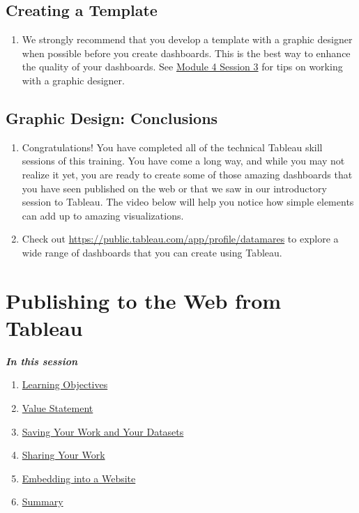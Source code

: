 \documentclass[
]{book}
\providecommand{\tightlist}{%
  \setlength{\itemsep}{0pt}\setlength{\parskip}{0pt}}
\begin{document}
\hypertarget{creating-a-template}{%
\subsection{Creating a Template}\label{creating-a-template}}

\begin{enumerate}
\def\labelenumi{\arabic{enumi}.}
\tightlist
\item
  We strongly recommend that you develop a template with a graphic designer when possible before you create dashboards. This is the best way to enhance the quality of your dashboards. See \protect\hyperlink{working-with-graphic-designers}{Module 4 Session 3} for tips on working with a graphic designer.
\end{enumerate}

\hypertarget{graphic-design-conclusions}{%
\subsection{Graphic Design: Conclusions}\label{graphic-design-conclusions}}

\begin{enumerate}
\def\labelenumi{\arabic{enumi}.}
\item
  Congratulations! You have completed all of the technical Tableau skill sessions of this training. You have come a long way, and while you may not realize it yet, you are ready to create some of those amazing dashboards that you have seen published on the web or that we saw in our introductory session to Tableau. The video below will help you notice how simple elements can add up to amazing visualizations.\\
\item
  Check out \url{https://public.tableau.com/app/profile/datamares} to explore a wide range of dashboards that you can create using Tableau.
\end{enumerate}

\hypertarget{publishing-to-the-web-from-tableau}{%
\section{Publishing to the Web from Tableau}\label{publishing-to-the-web-from-tableau}}

\textbf{\emph{In this session }}

\begin{enumerate}
\def\labelenumi{\arabic{enumi}.}
\tightlist
\item
  \protect\hyperlink{publishing-to-the-web-learning-objectives}{Learning Objectives}
\item
  \protect\hyperlink{publishing-to-the-web-value-statement}{Value Statement}
\item
  \protect\hyperlink{saving-your-work-and-your-datasets}{Saving Your Work and Your Datasets}
\item
  \protect\hyperlink{sharing-your-work}{Sharing Your Work}
\item
  \protect\hyperlink{embedding-into-a-website}{Embedding into a Website}
\item
  \protect\hyperlink{publishing-to-the-web-summary}{Summary}
\end{enumerate}
\end{document}
